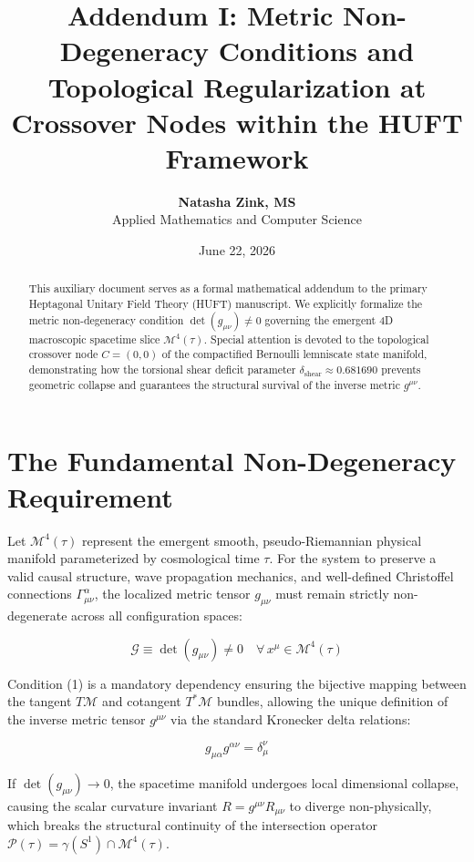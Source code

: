 \documentclass[11pt,a4paper]{article}
\title{\textbf{Addendum I: Metric Non-Degeneracy Conditions and Topological Regularization at Crossover Nodes within the HUFT Framework}}
\author{\textbf{Natasha Zink, MS} \\ \small Applied Mathematics and Computer Science}
\date{June 22, 2026}
\begin{document}
\maketitle

\begin{abstract}
This auxiliary document serves as a formal mathematical addendum to the primary Heptagonal Unitary Field Theory (HUFT) manuscript. We explicitly formalize the metric non-degeneracy condition $\det(g_{\mu\nu}) \neq 0$ governing the emergent 4D macroscopic spacetime slice $\mathcal{M}^4(\tau)$. Special attention is devoted to the topological crossover node $C=(0,0)$ of the compactified Bernoulli lemniscate state manifold, demonstrating how the torsional shear deficit parameter $\delta_{\text{shear}} \approx 0.681690$ prevents geometric collapse and guarantees the structural survival of the inverse metric $g^{\mu\nu}$.
\end{abstract}

\section{The Fundamental Non-Degeneracy Requirement}
Let $\mathcal{M}^4(\tau)$ represent the emergent smooth, pseudo-Riemannian physical manifold parameterized by cosmological time $\tau$. For the system to preserve a valid causal structure, wave propagation mechanics, and well-defined Christoffel connections $\Gamma^\alpha_{\mu\nu}$, the localized metric tensor $g_{\mu\nu}$ must remain strictly non-degenerate across all configuration spaces:

\begin{equation}
    \mathcal{G} \equiv \det(g_{\mu\nu}) \neq 0 \quad \forall \, x^\mu \in \mathcal{M}^4(\tau)
\end{equation}

Condition (1) is a mandatory dependency ensuring the bijective mapping between the tangent $T\mathcal{M}$ and cotangent $T^*\mathcal{M}$ bundles, allowing the unique definition of the inverse metric tensor $g^{\mu\nu}$ via the standard Kronecker delta relations:

\begin{equation}
    g_{\mu\alpha} g^{\alpha\nu} = \delta_{\mu}^\nu
\end{equation}

If $\det(g_{\mu\nu}) \to 0$, the spacetime manifold undergoes local dimensional collapse, causing the scalar curvature invariant $R = g^{\mu\nu}R_{\mu\nu}$ to diverge non-physically, which breaks the structural continuity of the intersection operator $\mathcal{P}(\tau) = \gamma(S^1) \cap \mathcal{M}^4(\tau)$.
\end{document}
